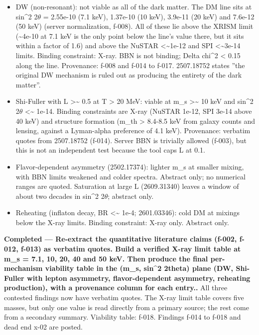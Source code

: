 \documentclass[11pt,a4paper]{article}
\begin{document}
\begin{itemize}
  \item DW (non-resonant): not viable as all of the dark matter. The DM line sits at sin\textasciicircum{}2 2$\theta$ = 2.55e-10 (7.1 keV), 1.37e-10 (10 keV), 3.9e-11 (20 keV) and 7.6e-12 (50 keV) (server normalization, f-008). All of these lie above the XRISM limit (\textasciitilde{}4e-10 at 7.1 keV is the only point below the line's value there, but it sits within a factor of 1.6) and above the NuSTAR \textless{}\textasciitilde{}1e-12 and SPI \textless{}\textasciitilde{}3e-14 limits. Binding constraint: X-ray. BBN is not binding; Delta chi\textasciicircum{}2 \textless{} 0.15 along the line. Provenance: f-008 and f-014 to f-017. 2507.18752 states ''the original DW mechanism is ruled out as producing the entirety of the dark matter''.
  \item Shi-Fuller with L \textgreater{}\textasciitilde{} 0.5 at T \textgreater{} 20 MeV: viable at m\_s \textgreater{}\textasciitilde{} 10 keV and sin\textasciicircum{}2 2$\theta$ \textless{}\textasciitilde{} 1e-14. Binding constraints are X-ray (NuSTAR 1e-12, SPI 3e-14 above 40 keV) and structure formation (m\_th \textgreater{} 8.4-8.5 keV from galaxy counts and lensing, against a Lyman-alpha preference of 4.1 keV). Provenance: verbatim quotes from 2507.18752 (f-014). Server BBN is trivially allowed (f-003), but this is not an independent test because the tool caps L at 0.1.
  \item Flavor-dependent asymmetry (2502.17374): lighter m\_s at smaller mixing, with BBN limits weakened and colder spectra. Abstract only; no numerical ranges are quoted. Saturation at large L (2609.31340) leaves a window of about two decades in sin\textasciicircum{}2 2$\theta$; abstract only.
  \item Reheating (inflaton decay, BR \textless{}\textasciitilde{} 1e-4; 2601.03346): cold DM at mixings below the X-ray limits. Binding constraint: X-ray only. Abstract only.
\end{itemize}
\textbf{Completed --- Re-extract the quantitative literature claims (f-002, f-012, f-013) as verbatim quotes. Build a verified X-ray limit table at m\_s = 7.1, 10, 20, 40 and 50 keV. Then produce the final per-mechanism viability table in the (m\_s, sin\textasciicircum{}2 2theta) plane (DW, Shi-Fuller with lepton asymmetry, flavor-dependent asymmetry, reheating production), with a provenance column for each entry..} All three contested findings now have verbatim quotes. The X-ray limit table covers five masses, but only one value is read directly from a primary source; the rest come from a secondary summary. Viability table: f-018. Findings f-014 to f-018 and dead end x-02 are posted.
\end{document}
